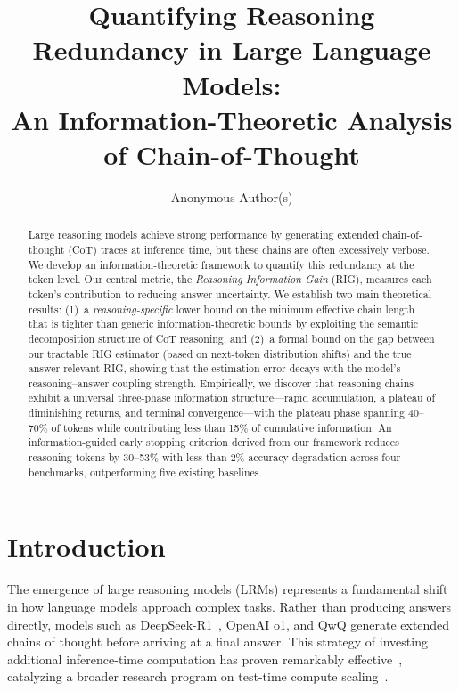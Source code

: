 \documentclass{article}
\title{Quantifying Reasoning Redundancy in Large Language Models: \\ An Information-Theoretic Analysis of Chain-of-Thought}
\author{%
  Anonymous Author(s)
}
\begin{document}
\maketitle

\begin{abstract}
Large reasoning models achieve strong performance by generating extended chain-of-thought (CoT) traces at inference time, but these chains are often excessively verbose. We develop an information-theoretic framework to quantify this redundancy at the token level. Our central metric, the \emph{Reasoning Information Gain} (RIG), measures each token's contribution to reducing answer uncertainty. We establish two main theoretical results: (1)~a \emph{reasoning-specific} lower bound on the minimum effective chain length that is tighter than generic information-theoretic bounds by exploiting the semantic decomposition structure of CoT reasoning, and (2)~a formal bound on the gap between our tractable RIG estimator (based on next-token distribution shifts) and the true answer-relevant RIG, showing that the estimation error decays with the model's reasoning--answer coupling strength. Empirically, we discover that reasoning chains exhibit a universal three-phase information structure---rapid accumulation, a plateau of diminishing returns, and terminal convergence---with the plateau phase spanning 40--70\% of tokens while contributing less than 15\% of cumulative information. An information-guided early stopping criterion derived from our framework reduces reasoning tokens by 30--53\% with less than 2\% accuracy degradation across four benchmarks, outperforming five existing baselines.
\end{abstract}

\section{Introduction}
\label{sec:intro}

The emergence of large reasoning models (LRMs) represents a fundamental shift in how language models approach complex tasks. Rather than producing answers directly, models such as DeepSeek-R1~\citep{deepseekr1}, OpenAI o1, and QwQ generate extended chains of thought before arriving at a final answer. This strategy of investing additional inference-time computation has proven remarkably effective~\citep{besta2025reasoning, li2025system12, muennighoff2025s1}, catalyzing a broader research program on test-time compute scaling~\citep{agarwal2025art, ji2025surveytts}.
\end{document}
